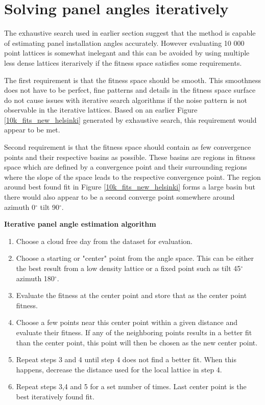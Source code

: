 \newpage

\clearpage

\section{Solving panel angles iteratively}
The exhaustive search used in earlier section suggest that the method is capable of estimating panel installation angles accurately. However evaluating 10 000 point lattices is somewhat inelegant and this can be avoided by using multiple less dense lattices iterarively if the fitness space satisfies some requirements.

The first requirement is that the fitness space should be smooth. This smoothness does not have to be perfect, fine patterns and details in the fitness space surface do not cause issues with iterative search algorithms if the noise pattern is not observable in the iterative lattices. Based on an earlier Figure \ref{10k_fits_new_helsinki} generated by exhaustive search, this requirement would appear to be met.

Second requirement is that the fitness space should contain as few convergence points and their respective basins as possible. These basins are regions in fitness space which are defined by a convergence point and their surrounding regions where the slope of the space leads to the respective convergence point. The region around best found fit in Figure \ref{10k_fits_new_helsinki} forms a large basin but there would also appear to be a second converge point somewhere around azimuth 0$^\circ$ tilt 90$^\circ$.

 

\noindent \textbf{Iterative panel angle estimation algorithm}
\begin{enumerate}
	\item Choose a cloud free day from the dataset for evaluation.
  \item Choose a starting or "center" point from the angle space. This can be either the best result from a low density lattice or a fixed point such as tilt 45$^\circ$ azimuth 180$^\circ$.
  \item Evaluate the fitness at the center point and store that as the center point fitness.
  \item Choose a few points near this center point within a given distance and evaluate their fitness. If any of the neighboring points results in a better fit than the center point, this point will then be chosen as the new center point.
  \item Repeat steps 3 and 4 until step 4 does not find a better fit. When this happens, decrease the distance used for the local lattice in step 4.
  \item Repeat steps 3,4 and 5 for a set number of times. Last center point is the best iteratively found fit.
\end{enumerate}



